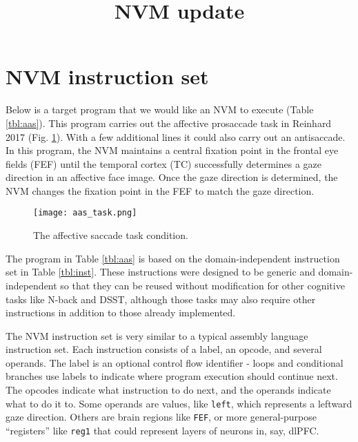 \documentclass[pdftex,12pt,letterpaper]{article}
\begin{document}
\title{NVM update}
\date{}
\maketitle

\section{NVM instruction set}

Below is a target program that we would like an NVM to execute (Table \ref{tbl:aas}).  This program carries out the affective prosaccade task in Reinhard 2017 (Fig. \ref{fig:aas_task}).  With a few additional lines it could also carry out an antisaccade.  In this program, the NVM maintains a central fixation point in the frontal eye fields (FEF) until the temporal cortex (TC) successfully determines a gaze direction in an affective face image.  Once the gaze direction is determined, the NVM changes the fixation point in the FEF to match the gaze direction.

\begin{figure}[H]
\centering
\texttt{[image: aas\_task.png]}
\caption{The affective saccade task condition.}
\label{fig:aas_task}
\end{figure}

The program in Table \ref{tbl:aas} is based on the domain-independent instruction set in Table \ref{tbl:inst}.  These instructions were designed to be generic and domain-independent so that they can be reused without modification for other cognitive tasks like N-back and DSST, although those tasks may also require other instructions in addition to those already implemented.

The NVM instruction set is very similar to a typical assembly language instruction set.  Each instruction consists of a label, an opcode, and several operands.  The label is an optional control flow identifier - loops and conditional branches use labels to indicate where program execution should continue next.  The opcodes indicate what instruction to do next, and the operands indicate what to do it to.  Some operands are values, like \texttt{left}, which represents a leftward gaze direction.  Others are brain regions like \texttt{FEF}, or more general-purpose ``registers'' like \texttt{reg1} that could represent layers of neurons in, say, dlPFC.
\end{document}
